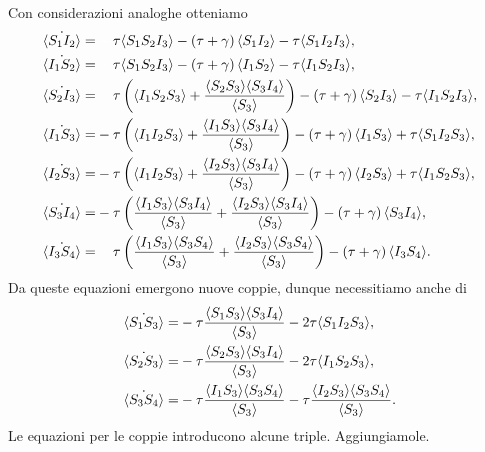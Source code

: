 Con considerazioni analoghe otteniamo
\begingroup
\allowdisplaybreaks
\begin{equation*}
 \begin{aligned}
 \dot{\angol{S_1I_2}} =&\spa \tau\angol{S_1S_2I_3} - \tonde{ \tau + \gamma} \angol{S_1 I_2} -\tau\angol{S_1I_2I_3},\\
\dot{\angol{I_1S_2}} =&\spa\tau\angol{S_1S_2I_3} - \tonde{ \tau + \gamma} \angol{I_1 S_2} -\tau\angol{I_1S_2I_3},\\
\dot{\angol{S_2I_3}} =&\spa \tau\tonde{\angol{I_1S_2S_3} +\frac{\angol{S_2S_3}\angol{S_3I_4}}{\angol{S_3}}} - \tonde{ \tau + \gamma} \angol{S_2 I_3} -\tau\angol{I_1S_2I_3},\\
\dot{\angol{I_1S_3}} =&- \tau\tonde{\angol{I_1I_2S_3} +\frac{\angol{I_1S_3}\angol{S_3I_4}}{\angol{S_3}}} - \tonde{ \tau + \gamma} \angol{I_1 S_3} +\tau\angol{S_1I_2S_3},\\ 
\dot{\angol{I_2S_3}} =&- \tau\tonde{\angol{I_1I_2S_3} +\frac{\angol{I_2S_3}\angol{S_3I_4}}{\angol{S_3}}}- \tonde{ \tau + \gamma} \angol{I_2 S_3} +\tau\angol{I_1S_2S_3},\\ 
\dot{\angol{S_3I_4}} =&- \tau\tonde{\frac{\angol{I_1S_3}\angol{S_3I_4}}{\angol{S_3}}+ \frac{\angol{I_2S_3}\angol{S_3I_4}}{\angol{S_3}}} - \tonde{ \tau + \gamma} \angol{S_3 I_4}, \\ 
\dot{\angol{I_3S_4}} =& \spa \tau\tonde{\frac{\angol{I_1S_3}\angol{S_3S_4}}{\angol{S_3}}+\frac{\angol{I_2S_3}\angol{S_3S_4}}{\angol{S_3}}} - \tonde{ \tau + \gamma} \angol{I_3 S_4}. 
\end{aligned}
\end{equation*}
\endgroup
 Da queste equazioni emergono nuove coppie, dunque necessitiamo anche di 
 \begin{equation*}
\begin{aligned}
	\dot{\langle S_1S_3 \rangle}=& - \tau \frac{\langle S_1S_3 \rangle\langle S_3I_4 \rangle}{\langle S_3 \rangle}- 2\tau \langle S_1I_2S_3 \rangle,\\
	\dot{\langle S_2S_3 \rangle}=& -\tau \frac{\langle S_2S_3 \rangle\langle S_3I_4 \rangle}{\langle S_3 \rangle} -2\tau \langle I_1S_2S_3 \rangle,\\
	\dot{\langle S_3S_4 \rangle}=& -\tau \frac{\langle I_1S_3 \rangle\langle S_3S_4 \rangle}{\langle S_3 \rangle}-\tau \frac{\langle I_2S_3 \rangle\langle S_3 S_4 \rangle}{\langle S_3 \rangle}.
\end{aligned} 	
 \end{equation*}
 Le equazioni per le coppie introducono alcune triple. Aggiungiamole.
\begingroup
\allowdisplaybreaks
